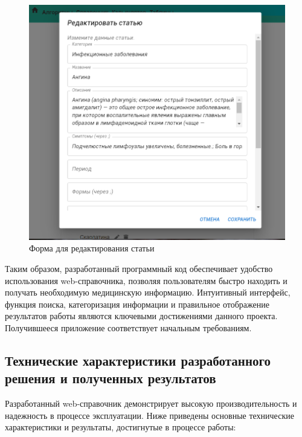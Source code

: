 \begin{itemize}
\begin{figure}
  \includegraphics[scale=0.6]{styles/diploma/inc/Редактирование.png}
  \caption{Форма для редактирования статьи}
  \label{fig:edit}
\end{figure} 

\end{itemize}

Таким образом, разработанный программный код обеспечивает удобство использования web-справочника, позволяя пользователям быстро находить и получать необходимую медицинскую информацию. Интуитивный интерфейс, функция поиска, категоризация информации и правильное отображение результатов работы являются ключевыми достижениями данного проекта. Получившееся приложение соответствует начальным требованиям.

\subsection{Технические характеристики разработанного решения и полученных результатов}

Разработанный web-справочник демонстрирует высокую производительность и надежность в процессе эксплуатации. Ниже приведены основные технические характеристики и результаты, достигнутые в процессе работы:

